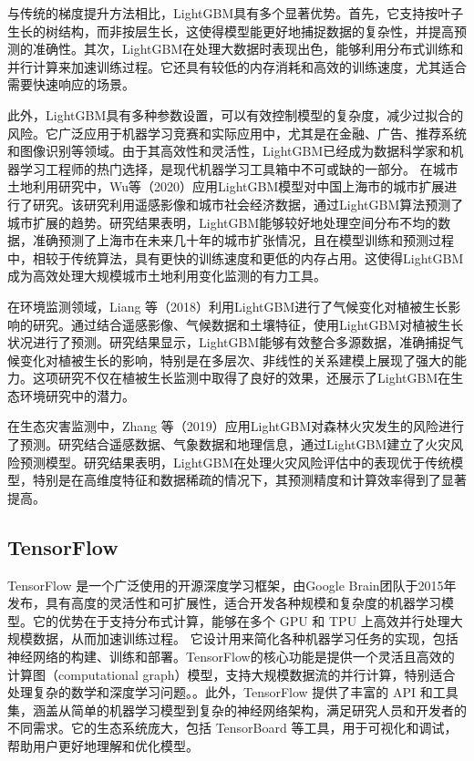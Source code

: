 \documentclass[AutoFakeBold]{LZUThesis-PgD&PhD}
\begin{document}
	与传统的梯度提升方法相比，LightGBM具有多个显著优势。首先，它支持按叶子生长的树结构，而非按层生长，这使得模型能更好地捕捉数据的复杂性，并提高预测的准确性。其次，LightGBM在处理大数据时表现出色，能够利用分布式训练和并行计算来加速训练过程。它还具有较低的内存消耗和高效的训练速度，尤其适合需要快速响应的场景。
	
	此外，LightGBM具有多种参数设置，可以有效控制模型的复杂度，减少过拟合的风险。它广泛应用于机器学习竞赛和实际应用中，尤其是在金融、广告、推荐系统和图像识别等领域。由于其高效性和灵活性，LightGBM已经成为数据科学家和机器学习工程师的热门选择，是现代机器学习工具箱中不可或缺的一部分。
	在城市土地利用研究中，Wu等（2020）应用LightGBM模型对中国上海市的城市扩展进行了研究\cite{wu2020}。该研究利用遥感影像和城市社会经济数据，通过LightGBM算法预测了城市扩展的趋势。研究结果表明，LightGBM能够较好地处理空间分布不均的数据，准确预测了上海市在未来几十年的城市扩张情况，且在模型训练和预测过程中，相较于传统算法，具有更快的训练速度和更低的内存占用。这使得LightGBM成为高效处理大规模城市土地利用变化监测的有力工具。
	
	在环境监测领域，Liang 等（2018）利用LightGBM进行了气候变化对植被生长影响的研究\cite{liang2018}。通过结合遥感影像、气候数据和土壤特征，使用LightGBM对植被生长状况进行了预测。研究结果显示，LightGBM能够有效整合多源数据，准确捕捉气候变化对植被生长的影响，特别是在多层次、非线性的关系建模上展现了强大的能力。这项研究不仅在植被生长监测中取得了良好的效果，还展示了LightGBM在生态环境研究中的潜力。
	
	在生态灾害监测中，Zhang 等（2019）应用LightGBM对森林火灾发生的风险进行了预测\cite{zhang2019}。研究结合遥感数据、气象数据和地理信息，通过LightGBM建立了火灾风险预测模型。研究结果表明，LightGBM在处理火灾风险评估中的表现优于传统模型，特别是在高维度特征和数据稀疏的情况下，其预测精度和计算效率得到了显著提高。
	
    \subsection{TensorFlow}
	
	TensorFlow 是一个广泛使用的开源深度学习框架，由Google Brain团队于2015年发布，具有高度的灵活性和可扩展性，适合开发各种规模和复杂度的机器学习模型。它的优势在于支持分布式计算，能够在多个 GPU 和 TPU 上高效并行处理大规模数据，从而加速训练过程。
	它设计用来简化各种机器学习任务的实现，包括神经网络的构建、训练和部署。TensorFlow的核心功能是提供一个灵活且高效的计算图（computational graph）模型，支持大规模数据流的并行计算，特别适合处理复杂的数学和深度学习问题。。此外，TensorFlow 提供了丰富的 API 和工具集，涵盖从简单的机器学习模型到复杂的神经网络架构，满足研究人员和开发者的不同需求。它的生态系统庞大，包括 TensorBoard 等工具，用于可视化和调试，帮助用户更好地理解和优化模型。
		
\end{document}
